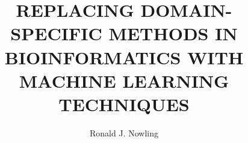 \documentclass[final,numrefs,twoadvisors,sort&compress,noinfo]{nddiss2e}
\begin{document}
\frontmatter

\title{REPLACING DOMAIN-SPECIFIC METHODS IN BIOINFORMATICS WITH MACHINE LEARNING TECHNIQUES}

\author{Ronald J. Nowling}





\maketitle

\makecopyright



\tableofcontents
\listoffigures
\listoftables



\mainmatter








\appendix


\backmatter



\end{document}

